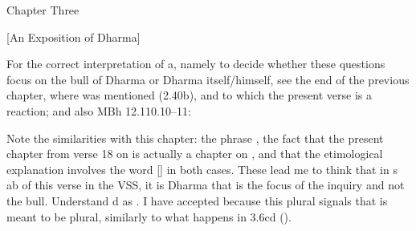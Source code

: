 


\vfill\pagebreak

\thispagestyle{empty}
\begin{center}
{\large{Chapter Three}}
\end{center}




\begin{center}
{{[An Exposition of Dharma]}}
\end{center}




{ For the correct interpretation of  a, namely to decide whether these questions                 focus on the bull of Dharma or Dharma itself/himself, see                  the end of the previous chapter, where  was mentioned (2.40b),                 and to which the present verse is a reaction; and also                 MBh 12.110.10--11:                 


                 Note the similarities with this chapter: the phrase ,                 the fact that the present chapter from verse 18 on is actually a chapter on ,                 and that the etimological explanation involves the word [] in                 both cases. These lead me to think that in s ab of this verse in the VSS,                 it is Dharma that is the focus of the inquiry and not the bull.  Understand  d as . I have accepted                          because this plural signals that  is meant to be plural,                         similarly to what happens in 3.6cd (). }





